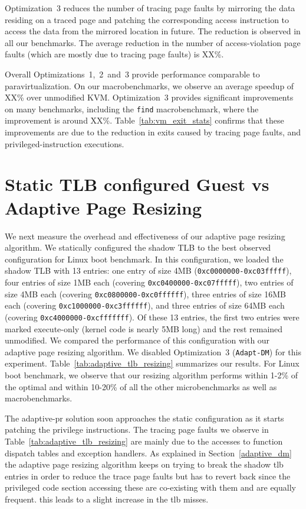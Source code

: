 Optimization~3 reduces the number of tracing page faults by mirroring the data residing on a traced page and patching the corresponding access instruction to access the data from the mirrored location in future. The reduction is observed in all our benchmarks. The average reduction in the number of access-violation page faults (which are mostly due to tracing page faults) is XX\%.

Overall Optimizations~1,~2~and~3 provide performance comparable to paravirtualization. On our macrobenchmarks, we observe an average speedup of XX\% over unmodified KVM. Optimization~3 provides significant improvements on many benchmarks, including the {\tt find} macrobenchmark, where the improvement is around XX\%. Table~\ref{tab:vm_exit_stats} confirms that these improvements are due to the reduction in exits caused by tracing page faults, and privileged-instruction executions.

\section{Static TLB configured Guest vs Adaptive Page Resizing}
We next measure the overhead and effectiveness of our adaptive page resizing algorithm. We statically configured the shadow TLB to the best observed configuration for Linux boot benchmark. In this configuration, we loaded the shadow TLB with 13 entries: one entry of size 4MB ({\tt 0xc0000000-0xc03fffff}), four entries of size 1MB each (covering {\tt 0xc0400000-0xc07fffff}), two entries of size 4MB each (covering {\tt 0xc0800000-0xc0ffffff}), three entries of size 16MB each (covering {\tt 0xc1000000-0xc3ffffff}), and three entries of size 64MB each (covering {\tt 0xc4000000-0xcfffffff}). Of these 13 entries, the first two entries were marked execute-only (kernel code is nearly 5MB long) and the rest remained unmodified. We compared the performance of this configuration with our adaptive page resizing algorithm. We disabled Optimization~3 ({\tt Adapt-DM}) for this experiment. Table~\ref{tab:adaptive_tlb_resizing} summarizes our results. For Linux boot benchmark, we observe that our resizing algorithm performs within 1-2\% of the optimal and within 10-20\% of all the other microbenchmarks as well as macrobenchmarks.

The adaptive-pr solution soon approaches the static configuration as it starts patching the privilege instructions. The tracing page faults we observe in Table~\ref{tab:adaptive_tlb_resizing} are mainly due to the accesses to function dispatch tables and exception handlers. As explained in Section~\ref{adaptive_dm} the adaptive page resizing algorithm keeps on trying to break the shadow tlb entries in order to reduce the trace page faults but has to revert back since the privileged code section accessing these are co-existing with them and are equally frequent. this leads to a slight increase in the tlb misses. 

